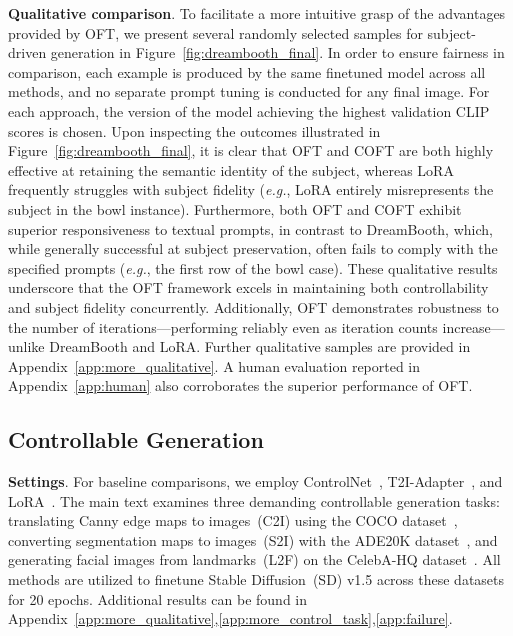 \textbf{Qualitative comparison}. To facilitate a more intuitive grasp of the advantages provided by OFT, we present several randomly selected samples for subject-driven generation in Figure~\ref{fig:dreambooth_final}. In order to ensure fairness in comparison, each example is produced by the same finetuned model across all methods, and no separate prompt tuning is conducted for any final image. For each approach, the version of the model achieving the highest validation CLIP scores is chosen. Upon inspecting the outcomes illustrated in Figure~\ref{fig:dreambooth_final}, it is clear that OFT and COFT are both highly effective at retaining the semantic identity of the subject, whereas LoRA frequently struggles with subject fidelity (\emph{e.g.}, LoRA entirely misrepresents the subject in the bowl instance). Furthermore, both OFT and COFT exhibit superior responsiveness to textual prompts, in contrast to DreamBooth, which, while generally successful at subject preservation, often fails to comply with the specified prompts (\emph{e.g.}, the first row of the bowl case). These qualitative results underscore that the OFT framework excels in maintaining both controllability and subject fidelity concurrently. Additionally, OFT demonstrates robustness to the number of iterations—performing reliably even as iteration counts increase—unlike DreamBooth and LoRA. Further qualitative samples are provided in Appendix~\ref{app:more_qualitative}. A human evaluation reported in Appendix~\ref{app:human} also corroborates the superior performance of OFT.

\subsection{Controllable Generation}

\textbf{Settings}. For baseline comparisons, we employ ControlNet~\cite{zhang2023adding}, T2I-Adapter~\cite{mou2023t2i}, and LoRA~\cite{hulora2022}. The main text examines three demanding controllable generation tasks: translating Canny edge maps to images~(C2I) using the COCO dataset~\cite{lin2014microsoft}, converting segmentation maps to images~(S2I) with the ADE20K dataset~\cite{zhou2017scene}, and generating facial images from landmarks~(L2F) on the CelebA-HQ dataset~\cite{karras2018progressive,xia2021tedigan}. All methods are utilized to finetune Stable Diffusion~(SD) v1.5 across these datasets for 20 epochs. Additional results can be found in Appendix~\ref{app:more_qualitative},\ref{app:more_control_task},\ref{app:failure}.

